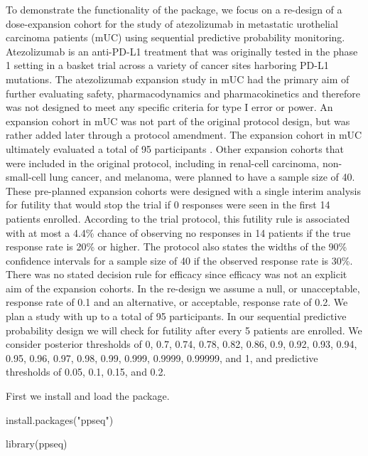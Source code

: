 To demonstrate the functionality of the  package, we focus on
a re-design of a dose-expansion cohort for the study of atezolizumab in
metastatic urothelial carcinoma patients (mUC) using sequential
predictive probability monitoring. Atezolizumab is an anti-PD-L1
treatment that was originally tested in the phase 1 setting in a basket
trial across a variety of cancer sites harboring PD-L1 mutations. The
atezolizumab expansion study in mUC had the primary aim of further
evaluating safety, pharmacodynamics and pharmacokinetics and therefore
was not designed to meet any specific criteria for type I error or
power. An expansion cohort in mUC was not part of the original protocol
design, but was rather added later through a protocol amendment. The
expansion cohort in mUC ultimately evaluated a total of 95 participants
\citep{Powles2014}. Other expansion cohorts that were included in the
original protocol, including in renal-cell carcinoma, non-small-cell
lung cancer, and melanoma, were planned to have a sample size of 40.
These pre-planned expansion cohorts were designed with a single interim
analysis for futility that would stop the trial if 0 responses were seen
in the first 14 patients enrolled. According to the trial protocol, this
futility rule is associated with at most a 4.4\% chance of observing no
responses in 14 patients if the true response rate is 20\% or higher.
The protocol also states the widths of the 90\% confidence intervals for
a sample size of 40 if the observed response rate is 30\%. There was no
stated decision rule for efficacy since efficacy was not an explicit aim
of the expansion cohorts. In the re-design we assume a null, or
unacceptable, response rate of 0.1 and an alternative, or acceptable,
response rate of 0.2. We plan a study with up to a total of 95
participants. In our sequential predictive probability design we will
check for futility after every 5 patients are enrolled. We consider
posterior thresholds of 0, 0.7, 0.74, 0.78, 0.82, 0.86, 0.9, 0.92, 0.93,
0.94, 0.95, 0.96, 0.97, 0.98, 0.99, 0.999, 0.9999, 0.99999, and 1, and
predictive thresholds of 0.05, 0.1, 0.15, and 0.2.

First we install and load the  package.

\begin{Schunk}
\begin{Sinput}
install.packages("ppseq")
\end{Sinput}
\end{Schunk}

\begin{Schunk}
\begin{Sinput}
library(ppseq)
\end{Sinput}
\end{Schunk}

